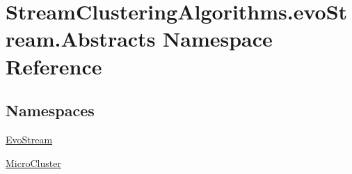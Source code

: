 \hypertarget{namespaceStreamClusteringAlgorithms_1_1evoStream_1_1Abstracts}{}\section{Stream\+Clustering\+Algorithms.\+evo\+Stream.\+Abstracts Namespace Reference}
\label{namespaceStreamClusteringAlgorithms_1_1evoStream_1_1Abstracts}
\subsection*{Namespaces}
\begin{DoxyCompactItemize}
\item 
 \hyperlink{namespaceStreamClusteringAlgorithms_1_1evoStream_1_1Abstracts_1_1EvoStream}{Evo\+Stream}
\item 
 \hyperlink{namespaceStreamClusteringAlgorithms_1_1evoStream_1_1Abstracts_1_1MicroCluster}{Micro\+Cluster}
\end{DoxyCompactItemize}
